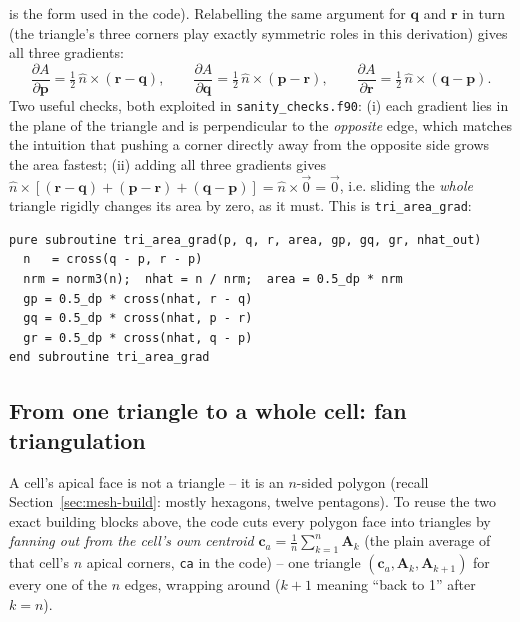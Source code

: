\documentclass[11pt,a4paper]{report}
\newcommand{\rvec}{\mathbf{r}}
\newcommand{\pvec}{\mathbf{p}}
\newcommand{\qvec}{\mathbf{q}}
\newcommand{\Aarr}{\mathbf{A}}
\newcommand{\ca}{\mathbf{c}_a}
\begin{document}
is the form used in the code). Relabelling the same argument for
$\qvec$ and $\rvec$ in turn (the triangle's three corners play exactly
symmetric roles in this derivation) gives all three gradients:
\begin{equation}
  \frac{\partial A}{\partial \pvec} = \tfrac12\, \hat n\times(\rvec-\qvec), \qquad
  \frac{\partial A}{\partial \qvec} = \tfrac12\, \hat n\times(\pvec-\rvec), \qquad
  \frac{\partial A}{\partial \rvec} = \tfrac12\, \hat n\times(\qvec-\pvec).
  \label{eq:tri-grad}
\end{equation}
Two useful checks, both exploited in \texttt{sanity\_checks.f90}: (i)
each gradient lies in the plane of the triangle and is perpendicular to
the \emph{opposite} edge, which matches the intuition that pushing a
corner directly away from the opposite side grows the area fastest;
(ii) adding all three gradients gives
$\hat n\times[(\rvec-\qvec)+(\pvec-\rvec)+(\qvec-\pvec)]=\hat n\times\vec 0=\vec 0$,
i.e. sliding the \emph{whole} triangle rigidly changes its area by
zero, as it must. This is \texttt{tri\_area\_grad}:

\begin{lstlisting}
pure subroutine tri_area_grad(p, q, r, area, gp, gq, gr, nhat_out)
  n   = cross(q - p, r - p)
  nrm = norm3(n);  nhat = n / nrm;  area = 0.5_dp * nrm
  gp = 0.5_dp * cross(nhat, r - q)
  gq = 0.5_dp * cross(nhat, p - r)
  gr = 0.5_dp * cross(nhat, q - p)
end subroutine tri_area_grad
\end{lstlisting}

\subsection{From one triangle to a whole cell: fan triangulation}
\label{sec:fan}
A cell's apical face is not a triangle -- it is an $n$-sided polygon
(recall Section~\ref{sec:mesh-build}: mostly hexagons, twelve
pentagons). To reuse the two exact building blocks above, the code
cuts every polygon face into triangles by \emph{fanning out from the
cell's own centroid} $\ca = \tfrac1n\sum_{k=1}^n \Aarr_k$ (the plain
average of that cell's $n$ apical corners, \texttt{ca} in the code) --
one triangle $(\ca, \Aarr_k, \Aarr_{k+1})$ for every one of the $n$
edges, wrapping around ($k{+}1$ meaning ``back to 1'' after $k=n$).
\end{document}
